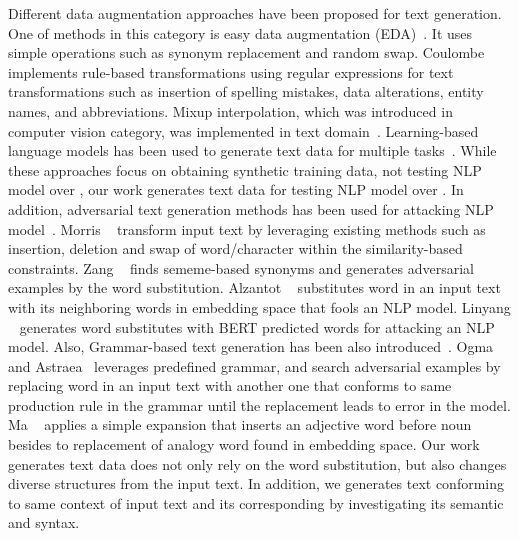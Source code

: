 %
Different data augmentation approaches have been proposed for text
generation. One of methods in this category is easy data augmentation
(EDA)~\cite{weizou2019eda}. It uses simple operations such as synonym
replacement and random swap. Coulombe~\cite{coulombe2018textaugapi}
implements rule-based transformations using regular expressions for
text transformations such as insertion of spelling mistakes, data
alterations, entity names, and abbreviations. Mixup interpolation,
which was introduced in computer vision category, was implemented in
text domain~\cite{hongyu2019dataaugmixup}. Learning-based language
models has been used to generate text data for multiple
tasks~\cite{qizhe2019unsupdataaug, ateret2019lambda}. While these
approaches focus on obtaining synthetic training data, not testing NLP
model over \lcs,
our work generates text data for testing NLP model over \lcs.  In
addition, adversarial text generation methods has been used for
attacking NLP
model~\cite{morris2020textattack,zang2020sememepso,alzantot2018genadvexp,linyang2020bertattack}. Morris \textit{\etal}~\cite{morris2020textattack}
transform input text by leveraging existing methods such as insertion,
deletion and swap of word/character within the similarity-based
constraints. Zang \textit{\etal}~\cite{zang2020sememepso} finds
sememe-based synonyms and generates adversarial examples by the word
substitution. Alzantot \textit{\etal}~\cite{alzantot2018genadvexp}
substitutes word in an input text with its neighboring words in
embedding space that fools an NLP
model. Linyang \textit{\etal}~\cite{linyang2020bertattack} generates
word substitutes with BERT predicted words for attacking an NLP
model. Also, Grammar-based text generation has been also
introduced~\cite{udeshi2019ogma,soremekun2020astraea,maIJCAI2020mtnlp}.
Ogma~\cite{udeshi2019ogma} and Astraea~\cite{soremekun2020astraea}
leverages predefined grammar, and search adversarial examples by
replacing word in an input text with another one that conforms to same
production rule in the grammar until the replacement leads to error in
the model. Ma \textit{\etal}~\cite{maIJCAI2020mtnlp} applies a simple
expansion that inserts an adjective word before noun besides to
replacement of analogy word found in embedding space. Our work
generates text data does not only rely on the word substitution, but
also changes diverse structures from the input text. In addition, we
generates text conforming to same context of input text and its
corresponding \lc by investigating its semantic and syntax.

